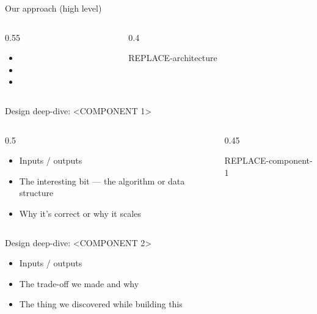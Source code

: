 \documentclass[aspectratio=169,12pt]{beamer}
\begin{document}
\begin{frame}{Our approach (high level)}
  \begin{columns}[T]
    \begin{column}{0.55\textwidth}
      \begin{itemize}
        \item <One-sentence headline>
        \item <Key design decision 1>
        \item <Key design decision 2>
      \end{itemize}
    \end{column}
    \begin{column}{0.4\textwidth}
      \fbox{\rule{0pt}{4.5cm}\rule{\textwidth}{0pt}}
      \begin{center}\footnotesize REPLACE-architecture\end{center}
    \end{column}
  \end{columns}
\end{frame}

\begin{frame}{Design deep-dive: <COMPONENT 1>}
  \begin{columns}[T]
    \begin{column}{0.5\textwidth}
      \begin{itemize}
        \item Inputs / outputs
        \item The interesting bit --- the algorithm or data structure
        \item Why it's correct or why it scales
      \end{itemize}
    \end{column}
    \begin{column}{0.45\textwidth}
      \fbox{\rule{0pt}{4.5cm}\rule{\textwidth}{0pt}}
      \begin{center}\footnotesize REPLACE-component-1\end{center}
    \end{column}
  \end{columns}
\end{frame}

\begin{frame}{Design deep-dive: <COMPONENT 2>}
  \begin{itemize}
    \item Inputs / outputs
    \item The trade-off we made and why
    \item The thing we discovered while building this
  \end{itemize}
\end{frame}
\end{document}
